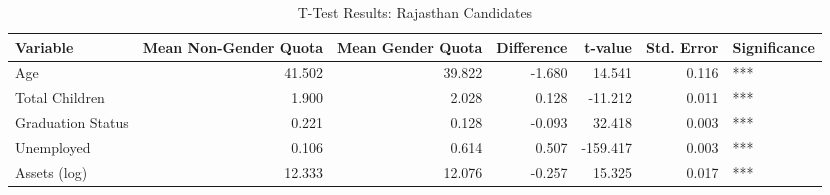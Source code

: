 \begin{table}

\caption{T-Test Results: Rajasthan Candidates}
\centering
\begin{tabular}[t]{l|r|r|r|r|r|l}
\hline
\textbf{Variable} & \textbf{Mean Non-Gender Quota} & \textbf{Mean Gender Quota} & \textbf{Difference} & \textbf{t-value} & \textbf{Std. Error} & \textbf{Significance}\\
\hline
Age & 41.502 & 39.822 & -1.680 & 14.541 & 0.116 & ***\\
\hline
Total Children & 1.900 & 2.028 & 0.128 & -11.212 & 0.011 & ***\\
\hline
Graduation Status & 0.221 & 0.128 & -0.093 & 32.418 & 0.003 & ***\\
\hline
Unemployed & 0.106 & 0.614 & 0.507 & -159.417 & 0.003 & ***\\
\hline
Assets (log) & 12.333 & 12.076 & -0.257 & 15.325 & 0.017 & ***\\
\hline
\end{tabular}
\end{table}
